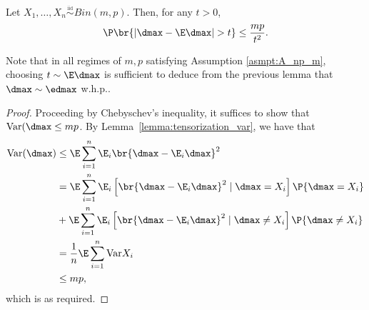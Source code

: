 \begin{lemma}\label{lemma:d_max_concentration}
    Let $X_1, \ldots, X_n  \overset{\underset{\mathrm{iid}}{}}{\sim} Bin(m,p)$. Then, for any $t > 0$, 
    \begin{align*}
        \P\br{\left |\dmax-\E \dmax\right|> t}\leq \frac{mp}{t^2}.
    \end{align*}
\end{lemma}
\begin{remark}
    Note that in all regimes of $m, p$ satisfying Assumption \ref{asmpt:A_np_m}, choosing $t \sim {\E \dmax}$ is sufficient to deduce from the previous lemma that $\dmax\sim \edmax$ w.h.p..
\end{remark}
\begin{proof}
    Proceeding by Chebyschev's inequality, it suffices to show that $\text{Var}(\dmax\leq mp$. By Lemma~\ref{lemma:tensorization_var}, we have that 
    \begin{align*}
        \text{Var}(\dmax) & \leq \E \sum_{i = 1}^n \E_i\br{ \dmax - \E_i \dmax}^2\\
        & = \E \sum_{i = 1}^n \E_i\left[\br{ \dmax - \E_i \dmax}^2\mid \dmax = X_i \right]\P{\dmax = X_i} \\
        & +  \E \sum_{i = 1}^n \E_i\left[\br{ \dmax - \E_i \dmax}^2\mid \dmax \neq X_i \right]\P{\dmax \neq X_i} \\
        & = \frac1n\E \sum_{i = 1}^n \text{Var}X_i \\
        & \leq mp,
    \end{align*}
which is as required.
\end{proof}

